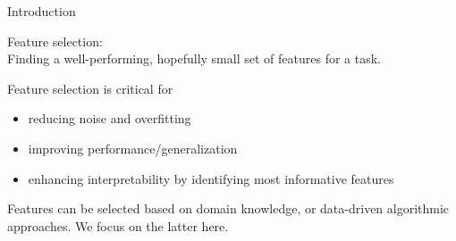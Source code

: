 \documentclass[11pt,compress,t,notes=noshow, xcolor=table]{beamer}
\begin{document}
    

\begin{vbframe}{Introduction}

    Feature selection: \\
    Finding a well-performing, 
    hopefully small set of features for a task.
    

    \lz
    Feature selection is critical for 
    \begin{itemize}
       \item reducing noise and overfitting
       \item improving performance/generalization
       \item enhancing interpretability by identifying most informative features
    \end{itemize}

 \vspace{0.5cm}
   

    Features can be selected based on domain knowledge, or data-driven algorithmic approaches. We focus on the latter here.
  \end{vbframe}


%
%
\end{document}
